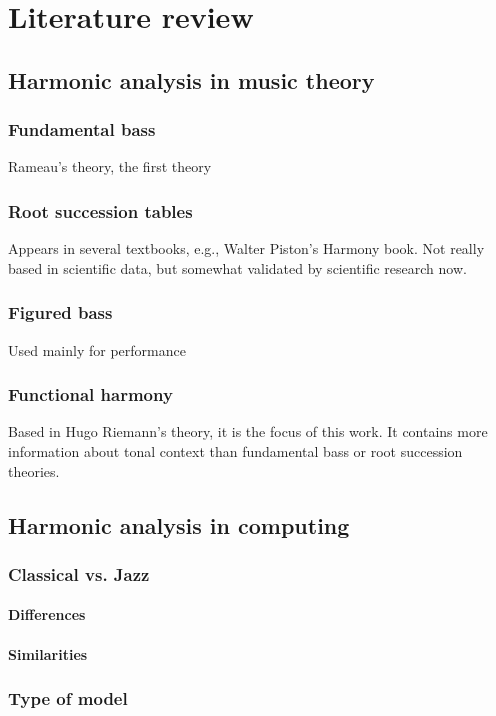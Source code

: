 \normallinespacing

\chapter{Literature review}

\section{Harmonic analysis in music theory}
  \subsection{Fundamental bass}
  Rameau's theory, the first theory
  \subsection{Root succession tables}
  Appears in several textbooks, e.g., Walter Piston's Harmony book. Not really based in scientific data, but somewhat validated by scientific research now.
  \subsection{Figured bass}
  Used mainly for performance
  \subsection{Functional harmony}
  Based in Hugo Riemann's theory, it is the focus of this work. It contains more information about tonal context than fundamental bass or root succession theories.

\section{Harmonic analysis in computing}
  \subsection{Classical vs. Jazz}
    \subsubsection{Differences}
    \subsubsection{Similarities}
  \subsection{Type of model}
